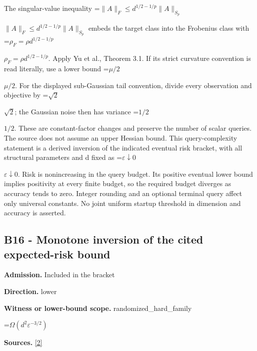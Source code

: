 \documentclass[10pt,a4paper]{article}
\newcommand{\AtlasMath}[1]{\par\begingroup\centering\setbox0=\hbox{$\displaystyle #1$}\ifdim\wd0>1.4\linewidth\typeout{ATLAS WIDE FORMULA: \the\wd0}\fi\ifdim\wd0>\linewidth\resizebox{\linewidth}{!}{\box0}\else\box0\fi\par\endgroup}
\newcommand{\AtlasInlineMath}[1]{\begingroup\setbox0=\hbox{$#1$}\ifdim\wd0>.4\linewidth\endgroup\AtlasMath{#1}\else\endgroup$#1$\fi}
\begin{document}
The singular-value inequality \AtlasInlineMath{\|A\|_F\le d^{1/2-1/p}\|A\|_{S_p}} embeds the target class into the Frobenius class with \AtlasInlineMath{\rho_F=\rho d^{1/2-1/p}}. Apply Yu et al., Theorem 3.1. If its strict curvature convention is read literally, use a lower bound \AtlasInlineMath{\mu/2}. For the displayed sub-Gaussian tail convention, divide every observation and objective by \AtlasInlineMath{\sqrt2}; the Gaussian noise then has variance \AtlasInlineMath{1/2}. These are constant-factor changes and preserve the number of scalar queries. The source does not assume an upper Hessian bound. This query-complexity statement is a derived inversion of the indicated eventual risk bracket, with all structural parameters and d fixed as \AtlasInlineMath{\varepsilon\downarrow0}. Risk is nonincreasing in the query budget. Its positive eventual lower bound implies positivity at every finite budget, so the required budget diverges as accuracy tends to zero. Integer rounding and an optional terminal query affect only universal constants. No joint uniform startup threshold in dimension and accuracy is asserted.



\subsection{B16 - Monotone inversion of the cited expected-risk bound}


\textbf{Admission.} Included in the bracket



\textbf{Direction.} lower



\textbf{Witness or lower-bound scope.} randomized\_hard\_family



\AtlasMath{\Omega(d^2\varepsilon^{-3/2})}


\textbf{Sources.} \href{https://arxiv.org/html/2610.00276v2}{[2]}
\end{document}
